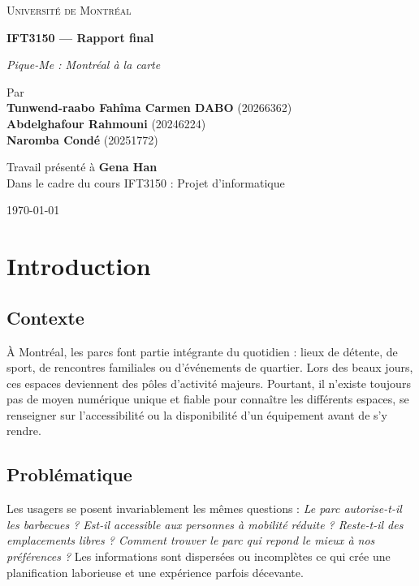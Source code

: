 \documentclass[12pt,a4paper]{article}
\newcommand{\university}{\textsc{Université de Montréal}}
\newcommand{\mainTitle}{\textbf{IFT3150 — Rapport final}}
\newcommand{\projectSubtitle}{\large\emph{Pique-Me :  Montréal à la carte}}
\newcommand{\authorsBlock}{%
  Par\\[0.75em]
  \textbf{Tunwend-raabo Fahîma Carmen DABO } (20266362)\\
  \textbf{Abdelghafour Rahmouni} (20246224)\\
  \textbf{Naromba Condé} (20251772)
}
\newcommand{\presentedTo}{Travail présenté à \textbf{Gena Han}\\[0.25em]
Dans le cadre du cours IFT3150 : Projet d'informatique}
\newcommand{\dateBlock}{\today}
\begin{document}

\begin{titlepage}
  \centering
  \vspace*{1.5cm}
  {\Large \university\par}
  \vfill
  {\Large \mainTitle\par}
  \vspace{0.75cm}
  {\projectSubtitle\par}
  \vfill
  {\authorsBlock\par}
  \vfill
  {\presentedTo\par}
  \vspace{0.75cm}
  {\dateBlock\par}
\end{titlepage}

\clearpage
\tableofcontents
\clearpage
{}

\section{Introduction}

\subsection*{Contexte}
À Montréal, les parcs font partie intégrante du quotidien : lieux de détente,
de sport, de rencontres familiales ou d'événements de quartier.
Lors des beaux jours, ces espaces deviennent des pôles d'activité
majeurs. Pourtant, il n'existe toujours pas de moyen numérique unique
et fiable pour connaître les différents espaces, se renseigner sur l'accessibilité ou la
disponibilité d'un équipement avant de s'y rendre.

\subsection*{Problématique}
Les usagers se posent invariablement les mêmes questions :
\textit{Le parc autorise-t-il les barbecues ? Est-il accessible aux personnes à mobilité réduite ?
Reste-t-il des emplacements libres ? Comment trouver le parc qui repond le mieux à nos préférences ?}  
Les informations sont dispersées ou incomplètes ce qui crée une
planification laborieuse et une expérience parfois décevante.
\end{document}
